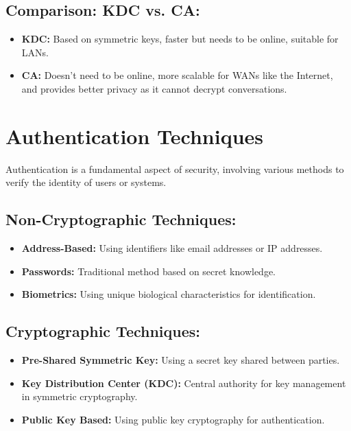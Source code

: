 \documentclass[12pt]{article}
\begin{document}
\subsection*{Comparison: KDC vs. CA:}
\begin{itemize}
    \item \textbf{KDC:} Based on symmetric keys, faster but needs to be online, suitable for LANs.
    \item \textbf{CA:} Doesn't need to be online, more scalable for WANs like the Internet, and provides better privacy as it cannot decrypt conversations.
\end{itemize}

\section*{Authentication Techniques}

Authentication is a fundamental aspect of security, involving various methods to verify the identity of users or systems.

\subsection*{Non-Cryptographic Techniques:}
\begin{itemize}
    \item \textbf{Address-Based:} Using identifiers like email addresses or IP addresses.
    \item \textbf{Passwords:} Traditional method based on secret knowledge.
    \item \textbf{Biometrics:} Using unique biological characteristics for identification.
\end{itemize}

\subsection*{Cryptographic Techniques:}
\begin{itemize}
    \item \textbf{Pre-Shared Symmetric Key:} Using a secret key shared between parties.
    \item \textbf{Key Distribution Center (KDC):} Central authority for key management in symmetric cryptography.
    \item \textbf{Public Key Based:} Using public key cryptography for authentication.
\end{itemize}
\end{document}
